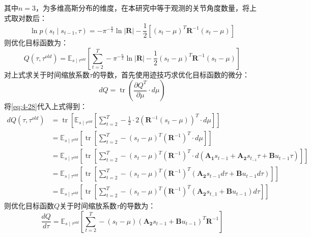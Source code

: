 其中$n=3$，为多维高斯分布的维度，在本研究中等于观测的关节角度数量，将上式取对数后：
\begin{equation}
    \ln p\left(s_t \mid s_{t-1}, \tau\right)=-\pi^{-\frac{n}{2}}\ln\mathbf{|R|}-\frac{1}{2}\left[\left(s_t-\mu\right)^T \mathbf{R}^{-1}\left(s_t-\mu\right)\right]
\end{equation}
则优化目标函数为：
\begin{equation}
    Q\left(\tau, \tau^{old}\right)
    =\mathbb{E}_{s \mid \tau^{old}}\left[\sum_{t=2}^T-\pi^{-\frac{n}{2}}\ln\mathbf{|R|}-\frac{1}{2}\left(s_t-\mu\right)^T \mathbf{R}^{-1}\left(s_t-\mu\right)\right]
    \label{eq:4-28}
\end{equation}
对上式求关于时间缩放系数$\tau$的导数，首先使用迹技巧求优化目标函数的微分：
\begin{equation}
    d Q=\operatorname{tr}\left(\frac{\partial Q^T}{\partial \mu} \cdot d \mu\right)
\end{equation}
将\ref{eq:4-28}代入上式得到：
\begin{equation}
    \begin{aligned}
    d Q\left(\tau, \tau^{old}\right)
    & =\operatorname{tr}\left[\mathbb{E}_{s \mid \tau^{old}}\left[\sum_{t=2}^T-\frac{1}{2} \cdot 2 \left(\mathbf{R}^{-1}\left(s_t-\mu\right)\right)^T \cdot d \mu\right]\right] \\
    & =\mathbb{E}_{s \mid \tau^{old}}\left[\operatorname{tr}\left[\sum_{t=2}^T-\left(s_t-\mu\right)^T \left(\mathbf{R}^{-1}\right)^T \cdot d \mu\right]\right] \\
    & =\mathbb{E}_{s \mid \tau^{old}}\left[\operatorname{tr}\left[\sum_{t=2}^T-\left(s_t-\mu\right)^T \left(\mathbf{R}^{-1}\right)^T \cdot d\left(\mathbf{A_1} s_{t-1}+\mathbf{A_2} s_{t_{-1}} \tau+\mathbf{B} u_{t-1} \tau\right)\right]\right] \\
    & =\mathbb{E}_{s \mid \tau^{old}}\left[\operatorname{tr}\left[\sum_{t=2}^T-\left(s_t-\mu\right)^T \left(\mathbf{R}^{-1}\right)^T\left(\mathbf{A_2}s_{t-1} d \tau+\mathbf{B} u_{t-1} d \tau\right)\right]\right] \\
    & =\mathbb{E}_{s \mid \tau^{old}}\left[\operatorname{tr}\left[\sum_{t=2}^T-\left(s_t-\mu\right)^T \left(\mathbf{R}^{-1}\right)^T(\mathbf{A_2} s_{t_-1}+\mathbf{B} u_{t-1}) d \tau \right]\right]
    \end{aligned}
\end{equation}
则优化目标函数$Q$关于时间缩放系数$\tau$的导数为：
\begin{equation}
    \frac{d Q}{d \tau}=\mathbb{E}_{s \mid \tau^{old}}\left[\sum_{t=2}^T -\left(s_t-\mu\right)\left(\mathbf{A_2} s_{t-1}+\mathbf{B} u_{t-1}\right)^T\mathbf{R}^{-1}\right]
\end{equation}
